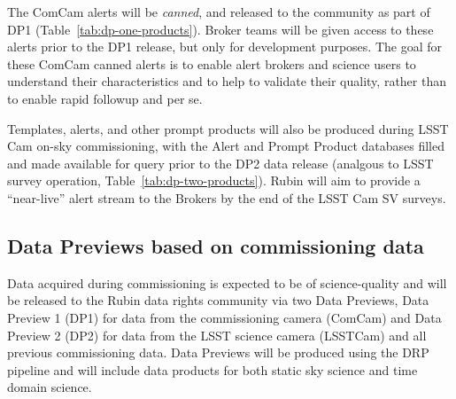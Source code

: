 The ComCam alerts will be {\it canned}, and released to the community as part of DP1 (Table~\ref{tab:dp-one-products}).
Broker teams will be given access to these alerts prior to the DP1 release, but only for development purposes.
The goal for these ComCam canned alerts is to enable alert brokers and science users to understand their characteristics and to help to validate their quality, rather than to enable rapid followup and \es per se.

Templates, alerts, and other prompt products will also be produced during LSST Cam on-sky commissioning, with the Alert and Prompt Product databases filled and made available for query prior to the DP2 data release (analgous to LSST survey operation, Table~\ref{tab:dp-two-products}). 
Rubin will aim to provide a ``near-live'' alert stream to the Brokers by the end of the LSST Cam SV surveys.


\subsection{Data Previews based on commissioning data}

Data acquired during commissioning is expected to be of science-quality and will be released to the Rubin data rights community via two Data Previews, Data Preview 1 (DP1) for data from the commissioning camera (ComCam) and Data Preview 2 (DP2) for data from the LSST science camera (LSSTCam) and all previous commissioning data.
Data Previews will be produced using the DRP pipeline and will include data products for both static sky science and time domain science.
